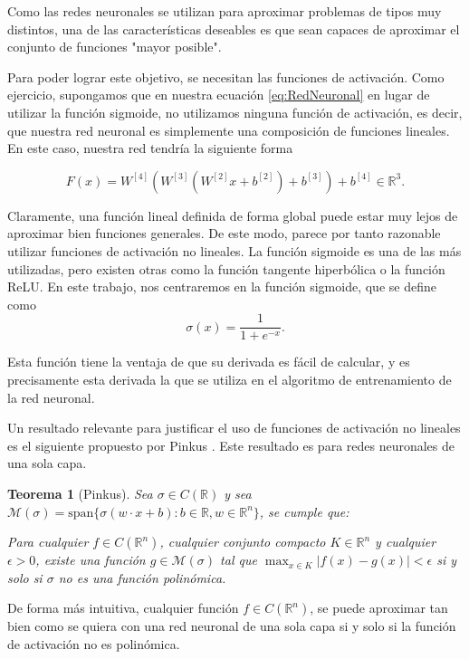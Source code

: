 \documentclass[a4paper,11pt,spanish, twoside, leqno]{tfg-uam}
\newtheorem{teor}{Teorema}[chapter]
\theoremstyle{definition}
\begin{document}
Como las redes neuronales se utilizan para aproximar problemas de tipos muy distintos, una de las características deseables es que sean  capaces de aproximar el conjunto de funciones "mayor posible".

Para poder lograr este objetivo, se necesitan las funciones de activación. Como ejercicio, supongamos que en nuestra ecuación \eqref{eq:RedNeuronal} en lugar de utilizar la función sigmoide, no utilizamos ninguna función de activación, es decir, que nuestra red neuronal es simplemente una composición de funciones lineales. En este caso, nuestra red tendría la siguiente forma

\begin{equation*}
    F(x)=W^{[4]}(W^{[3]}(W^{[2]}x+b^{[2]})+b^{[3]})+b^{[4]}\in\mathbb{R}^3.
\end{equation*}

Claramente, una función lineal definida de forma global puede estar muy lejos de aproximar bien funciones generales. De este modo, parece por tanto razonable utilizar funciones de activación no lineales. La función sigmoide es una de las más utilizadas, pero existen otras como la función tangente hiperbólica o la función ReLU. En este trabajo, nos centraremos en la función sigmoide, que se define como
\begin{equation*}
    \sigma(x)=\frac{1}{1+e^{-x}}.
\end{equation*}

Esta función tiene la ventaja de que su derivada es fácil de calcular, y es precisamente esta derivada la que se utiliza en el algoritmo de entrenamiento de la red neuronal.

Un resultado relevante para justificar el uso de funciones de activación no lineales es el siguiente propuesto por Pinkus \cite[Theorem 3.1]{pinkus1999approximation}. Este resultado es para redes neuronales de una sola capa.

\begin{teor}[Pinkus]
    Sea $\sigma\in C(\mathbb{R})$ y sea $\mathcal{M}(\sigma) = \text{span}\{\sigma(w\cdot x + b): b \in \mathbb{R}, w \in \mathbb{R}^n\}$, se cumple que:
    
    Para cualquier $f \in C(\mathbb{R}^n)$, cualquier conjunto compacto $K\in \mathbb{R}^n$ y cualquier $\epsilon > 0$, existe una función $g\in \mathcal{M}(\sigma)$ tal que $\max_{x\in K}|f(x)-g(x)|<\epsilon$ si y solo si $\sigma$ no es una función polinómica.
\end{teor}
De forma más intuitiva, cualquier función $f \in C(\mathbb{R}^n)$, se puede aproximar tan bien como se quiera con una red neuronal de una sola capa si y solo si la función de activación no es polinómica.
\end{document}
